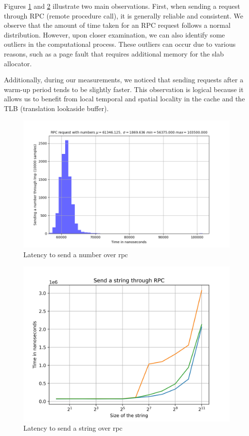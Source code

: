 Figures \ref{fig:b1} and \ref{fig:b2} illustrate two main observations. First, when sending a request through RPC (remote procedure call), it is generally reliable and consistent. We observe that the amount of time taken for an RPC request follows a normal distribution. However, upon closer examination, we can also identify some outliers in the computational process. These outliers can occur due to various reasons, such as a page fault that requires additional memory for the slab allocator.

Additionally, during our measurements, we noticed that sending requests after a warm-up period tends to be slightly faster. This observation is logical because it allows us to benefit from local temporal and spatial locality in the cache and the TLB (translation lookaside buffer).

\begin{figure}[htp]
    \centering
    \includegraphics[width=12cm]{images/benchmarks/send_number.png}
    \caption{Latency to send a number over rpc}
    \label{fig:b1}
\end{figure}


\begin{figure}[htp]
    \centering
    \includegraphics[width=12cm]{images/benchmarks/send_string.jpg}
    \caption{Latency to send a string over rpc}
    \label{fig:b2}
\end{figure}


